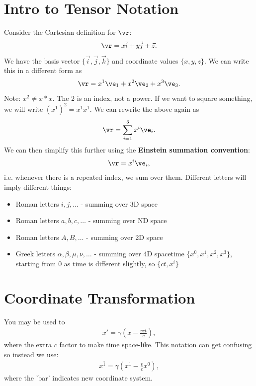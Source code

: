 \documentclass[a4paper, 11pt, normalem]{report}
\begin{document}
\section{Intro to Tensor Notation}
Consider the Cartesian definition for $\vr$:
\begin{align}
    \vr = x\vec{i} + y\vec{j} + \vec{z}.
\end{align}
We have the basis vector $\{\vec{i},\vec{j},\vec{k}\}$ and coordinate values $\{x,y,z\}$.
We can write this in a different form as
\begin{align}
    \vr = x^1\ve_1 + x^2\ve_2 + x^3\ve_3.
\end{align}
Note: $x^2 \neq x*x$.
The 2 is an index, not a power.
If we want to square something, we will write $(x^1)^2 = x^1x^1$.
We can rewrite the above again as
\begin{align}
    \vr = \sum_{i=1}^3 x^i\ve_i.
\end{align}
We can then simplify this further using the \textbf{Einstein summation convention}:
\begin{align}
    \vr = x^i\ve_i,
\end{align}
i.e. whenever there is a repeated index, we sum over them.
Different letters will imply different things:
\begin{itemize}
    \item Roman letters $i,j,\dots$ - summing over 3D space
    \item Roman letters $a,b,c,\dots$ - summing over ND space
    \item Roman letters $A,B,\dots$ - summing over 2D space
    \item Greek letters $\alpha,\beta,\mu,\nu,\dots$ - summing over 4D spacetime $\{x^0,x^1,x^2,x^3\}$, starting from 0 as time is different slightly, so $\{ct,x^i\}$
\end{itemize}

\section{Coordinate Transformation}
You may be used to
\begin{align}
    x' = \gamma\left(x-\frac{vct}{c}\right),
\end{align}
where the extra $c$ factor to make time space-like.
This notation can get confusing so instead we use:
\begin{align}
    x^{\bar{1}} = \gamma\left(x^1-\frac{v}{c}x^0\right),
\end{align}
where the 'bar' indicates new coordinate system.
\end{document}
